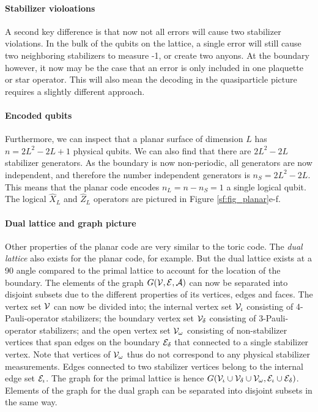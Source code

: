 \paragraph{Stabilizer violoations}
A second key difference is that now not all errors will cause two stabilizer violations. In the bulk of the qubits on the lattice, a single error will still cause two neighboring stabilizers to measure -1, or create two anyons. At the boundary however, it now may be the case that an error is only included in one plaquette or star operator. This will also mean the decoding in the quasiparticle picture requires a slightly different approach.

\paragraph{Encoded qubits}
Furthermore, we can inspect that a planar surface of dimension $L$ has $n = 2L^2-2L+1$ physical qubits. We can also find that there are $2L^2-2L$ stabilizer generators. As the boundary is now non-periodic, all generators are now independent, and therefore the number independent generators is $n_S = 2L^2-2L$. This means that the planar code encodes $n_L = n-n_S = 1$ a single logical qubit. The logical $\hat{X}_L$ and $\hat{Z}_L$ operators are pictured in Figure \ref{sf:fig_planar}e-f.

\paragraph{Dual lattice and graph picture}
Other properties of the planar code are very similar to the toric code. The \emph{dual lattice} also exists for the planar code, for example. But the dual lattice exists at a 90 angle compared to the primal lattice to account for the location of the boundary. The elements of the graph $G(\mathcal{V},\mathcal{E},\mathcal{A})$ can now be separated into disjoint subsets due to the different properties of its vertices, edges and faces. The vertex set $\mathcal{V}$ can now be divided into; the internal vertex set $\mathcal{V}_\iota$ consisting of 4-Pauli-operator stabilizers; the boundary vertex set $\mathcal{V}_{\delta}$ consisting of 3-Pauli-operator stabilizers; and the open vertex set $\mathcal{V}_\omega$ consisting of non-stabilizer vertices that span edges on the boundary $\mathcal{E}_{\delta}$ that connected to a single stabilizer vertex. Note that vertices of $\mathcal{V}_\omega$ thus do not correspond to any physical stabilizer measurements. Edges connected to two stabilizer vertices belong to the internal edge set $\mathcal{E}_\iota$. The graph for the primal lattice is hence $G(\mathcal{V}_\iota\cup \mathcal{V}_\delta \cup \mathcal{V}_\omega, \mathcal{E}_\iota\cup \mathcal{E}_\delta)$. Elements of the graph for the dual graph can be separated into disjoint subsets in the same way.


